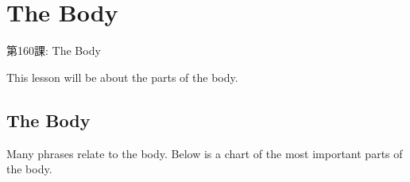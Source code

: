     
\chapter{The Body}

\begin{center}
\begin{Large}
第160課: The Body 
\end{Large}
\end{center}
 
\par{ This lesson will be about the parts of the body. }
      
\section{The Body}
  
\par{  Many phrases relate to the body. Below is a chart of the most important parts of the body.  \hfill\break
\hfill\break
}


